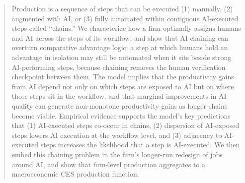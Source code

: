 \documentclass[12pt, final]{article}
\begin{document}
\begin{abstract}
\noindent
Production is a sequence of steps that can be executed (1) manually, (2) augmented with AI, or (3) fully automated within contiguous AI-executed steps called ``chains.''
We characterize how a firm optimally assigns humans and AI across the steps of its workflow, and show that AI chaining can overturn comparative advantage logic: a step at which humans hold an advantage in isolation may still be automated when it sits beside strong AI-performing steps, because chaining removes the human verification checkpoint between them.
The model implies that the productivity gains from AI depend not only on which steps are exposed to AI but on where those steps sit in the workflow, and that marginal improvements in AI quality can generate non-monotone productivity gains as longer chains become viable.
Empirical evidence supports the model's key predictions that (1) AI-executed steps co-occur in chains, (2) dispersion of AI-exposed steps lowers AI execution at the workflow level, and (3) adjacency to AI-executed steps increases the likelihood that a step is AI-executed.
We then embed this chaining problem in the firm's longer-run redesign of jobs around AI, and show that firm-level production aggregates to a macroeconomic CES production function.


\end{abstract}
\end{document}
